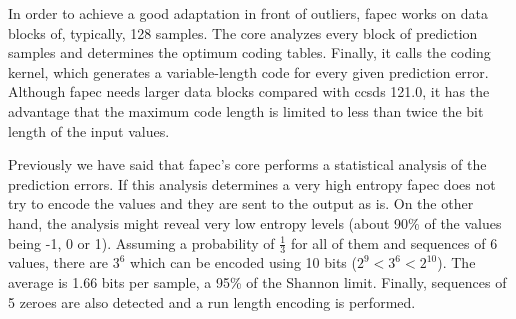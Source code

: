 In order to achieve a good adaptation in front of outliers, \acrshort{fapec} works on data blocks of, typically, 128 samples. The core analyzes every block of prediction samples and determines the optimum coding tables. Finally, it calls the coding kernel, which generates a variable-length code for every given prediction error. Although \acrshort{fapec} needs larger data blocks compared with \acrshort{ccsds} 121.0, it has the advantage that the maximum code length is limited to less than twice the bit length of the input values.

Previously we have said that \acrshort{fapec}'s core performs a statistical analysis of the prediction errors. If this analysis determines a very high entropy \acrshort{fapec} does not try to encode the values and they are sent to the output as is. On the other hand, the analysis might reveal very low entropy levels (about 90\% of the values being -1, 0 or 1). Assuming a probability of $\frac{1}{3}$ for all of them and sequences of 6 values, there are $3^6$ which can be encoded using 10 bits ($2^9 < 3^6 < 2^{10}$). The average is 1.66 bits per sample, a 95\% of the Shannon limit. Finally, sequences of 5 zeroes are also detected and a run length encoding is performed.
